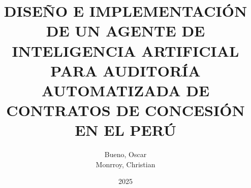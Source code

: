 \documentclass[a4paper, 12pt, oneside]{tesisutec}
\begin{document}

\title{DISEÑO E IMPLEMENTACIÓN DE UN AGENTE DE INTELIGENCIA ARTIFICIAL PARA AUDITORÍA AUTOMATIZADA DE CONTRATOS DE CONCESIÓN EN EL PERÚ}
\author{Bueno, Oscar  \\ Monrroy, Christian }


\date{2025}


\maketitle
{}


















\renewcommand{\contentsname}{\Large \bfseries TABLA DE CONTENIDO}

\tableofcontents
\newpage
\renewcommand{\listtablename}{\Large \bfseries ÍNDICE DE TABLAS}
\listoftables
\newpage
\renewcommand{\listfigurename}{\Large \bfseries ÍNDICE DE FIGURAS}
\listoffigures


\pagestyle{fancy}

 
















\renewcommand{\bibname}{\centering\Large\bf{REFERENCIAS BIBLIOGR\'AFICAS}}



\end{document}
